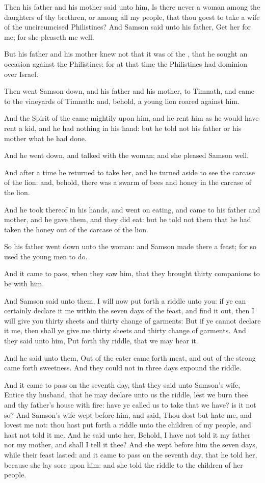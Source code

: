 \Verse Then his father and his mother said unto him, Is there never a woman among the daughters of thy brethren, or among all my people, that thou goest to take a wife of the uncircumcised Philistines? And Samson said unto his father, Get her for me; for she pleaseth me well.

\Verse But his father and his mother knew not that it was of the \LORD, that he sought an occasion against the Philistines: for at that time the Philistines had dominion over Israel.

\Verse Then went Samson down, and his father and his mother, to Timnath, and came to the vineyards of Timnath: and, behold, a young lion roared against him.

\Verse And the Spirit of the \LORD came mightily upon him, and he rent him as he would have rent a kid, and he had nothing in his hand: but he told not his father or his mother what he had done.

\Verse And he went down, and talked with the woman; and she pleased Samson well.

\Verse And after a time he returned to take her, and he turned aside to see the carcase of the lion: and, behold, there was a swarm of bees and honey in the carcase of the lion.

\Verse And he took thereof in his hands, and went on eating, and came to his father and mother, and he gave them, and they did eat: but he told not them that he had taken the honey out of the carcase of the lion.

\Verse So his father went down unto the woman: and Samson made there a feast; for so used the young men to do.

\Verse And it came to pass, when they saw him, that they brought thirty companions to be with him.

\Verse And Samson said unto them, I will now put forth a riddle unto you: if ye can certainly declare it me within the seven days of the feast, and find it out, then I will give you thirty sheets and thirty change of garments: \Verse But if ye cannot declare it me, then shall ye give me thirty sheets and thirty change of garments. And they said unto him, Put forth thy riddle, that we may hear it.

\Verse And he said unto them, Out of the eater came forth meat, and out of the strong came forth sweetness. And they could not in three days expound the riddle.

\Verse And it came to pass on the seventh day, that they said unto Samson's wife, Entice thy husband, that he may declare unto us the riddle, lest we burn thee and thy father's house with fire: have ye called us to take that we have? is it not so?  \Verse And Samson's wife wept before him, and said, Thou dost but hate me, and lovest me not: thou hast put forth a riddle unto the children of my people, and hast not told it me. And he said unto her, Behold, I have not told it my father nor my mother, and shall I tell it thee?  \Verse And she wept before him the seven days, while their feast lasted: and it came to pass on the seventh day, that he told her, because she lay sore upon him: and she told the riddle to the children of her people.

